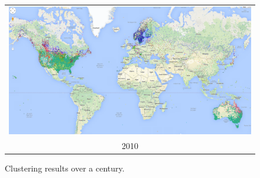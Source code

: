 \begin{figure}
\begin{tabular}{c}
        \includegraphics[width =.65\linewidth]{images/2010.png}\\ 2010\\
    \end{tabular}
    \caption{Clustering results over a century.}
\end{figure}

